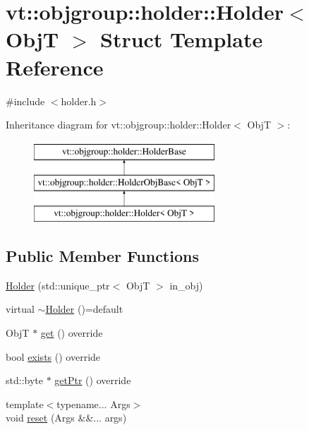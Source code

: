 \hypertarget{structvt_1_1objgroup_1_1holder_1_1_holder}{}\section{vt\+:\+:objgroup\+:\+:holder\+:\+:Holder$<$ ObjT $>$ Struct Template Reference}
\label{structvt_1_1objgroup_1_1holder_1_1_holder}


{\ttfamily \#include $<$holder.\+h$>$}

Inheritance diagram for vt\+:\+:objgroup\+:\+:holder\+:\+:Holder$<$ ObjT $>$\+:\begin{figure}[H]
\begin{center}
\leavevmode
\includegraphics[height=3.000000cm]{structvt_1_1objgroup_1_1holder_1_1_holder}
\end{center}
\end{figure}
\subsection*{Public Member Functions}
\begin{DoxyCompactItemize}
\item 
\hyperlink{structvt_1_1objgroup_1_1holder_1_1_holder_a7e21e5a25aaef942ad43d07e14e726eb}{Holder} (std\+::unique\+\_\+ptr$<$ ObjT $>$ in\+\_\+obj)
\item 
virtual \hyperlink{structvt_1_1objgroup_1_1holder_1_1_holder_acc7eb26ff3152043f63164898469fc78}{$\sim$\+Holder} ()=default
\item 
ObjT $\ast$ \hyperlink{structvt_1_1objgroup_1_1holder_1_1_holder_afa4ab0b8ce4108ad94f602772697c25d}{get} () override
\item 
bool \hyperlink{structvt_1_1objgroup_1_1holder_1_1_holder_a0c18e5f4287e37e6a89a72df90e68273}{exists} () override
\item 
std\+::byte $\ast$ \hyperlink{structvt_1_1objgroup_1_1holder_1_1_holder_a421058daef664fb76d90439aef1aaea5}{get\+Ptr} () override
\item 
{\footnotesize template$<$typename... Args$>$ }\\void \hyperlink{structvt_1_1objgroup_1_1holder_1_1_holder_a4ce99c48b611a65189a6891c780b6500}{reset} (Args \&\&... args)
\end{DoxyCompactItemize}
